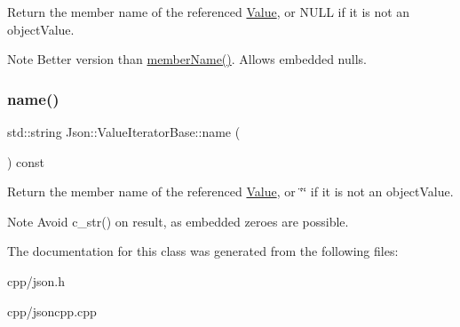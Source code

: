 Return the member name of the referenced \hyperlink{class_json_1_1_value}{Value}, or N\+U\+LL if it is not an object\+Value. \begin{DoxyNote}{Note}
Better version than \hyperlink{class_json_1_1_value_iterator_base_a54765da6759fd3f1edcbfbaf308ec263}{member\+Name()}. Allows embedded nulls. 
\end{DoxyNote}
\mbox{\label{class_json_1_1_value_iterator_base_aee092ed415744e97bad5540c420819b7}} 
\subsubsection{\texorpdfstring{name()}{name()}}
{\footnotesize\ttfamily std\+::string Json\+::\+Value\+Iterator\+Base\+::name (\begin{DoxyParamCaption}{ }\end{DoxyParamCaption}) const}

Return the member name of the referenced \hyperlink{class_json_1_1_value}{Value}, or \char`\"{}\char`\"{} if it is not an object\+Value. \begin{DoxyNote}{Note}
Avoid {\ttfamily c\+\_\+str()} on result, as embedded zeroes are possible. 
\end{DoxyNote}


The documentation for this class was generated from the following files\+:\begin{DoxyCompactItemize}
\item 
cpp/json.\+h\item 
cpp/jsoncpp.\+cpp\end{DoxyCompactItemize}
